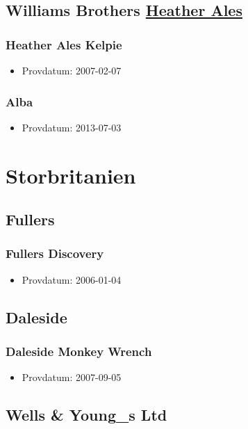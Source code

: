 \documentclass[11pt]{article}
\begin{document}
\subsection{Williams Brothers \underline{Heather Ales}}
\label{sec:orge197596}
\subsubsection{Heather Ales Kelpie}
\label{sec:org2b8c18f}
\begin{itemize}
\item Provdatum: 2007-02-07
\end{itemize}
\subsubsection{Alba}
\label{sec:orgfb83a02}
\begin{itemize}
\item Provdatum: 2013-07-03
\end{itemize}
\section{Storbritanien}
\label{sec:orgeef6943}
\subsection{Fullers}
\label{sec:org6a21b83}
\subsubsection{Fullers Discovery}
\label{sec:org548e9b6}
\begin{itemize}
\item Provdatum: 2006-01-04
\end{itemize}
\subsection{Daleside}
\label{sec:org15d26aa}
\subsubsection{Daleside Monkey Wrench}
\label{sec:org1768847}
\begin{itemize}
\item Provdatum: 2007-09-05
\end{itemize}
\subsection{Wells \& Young\_s Ltd}
\label{sec:org0844052}
\end{document}

